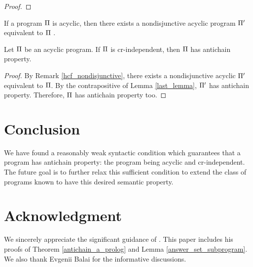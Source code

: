 \documentclass{paper}
\begin{document}
\begin{flushleft}
\begin{proof}
\end{proof}

\begin{remark}
\label{hcf_nondisjunctive}

If a \cp{} program $\Pi$ is acyclic,
then there exists a nondisjunctive acyclic \cp{} program
${\Pi}'$ equivalent to $\Pi$
\cite[page 73, Theorem 4.17]{hcfb}.

\end{remark}

\begin{theorem}
\label{last_theorem}

Let $\Pi$ be an acyclic \cp{} program.
If $\Pi$ is cr-independent,
then $\Pi$ has antichain property.

\end{theorem}

\begin{proof}

By Remark \ref{hcf_nondisjunctive},
there exists a nondisjunctive acyclic \cp{} ${\Pi}'$
equivalent to $\Pi$.
By the contrapositive of Lemma \ref{last_lemma},
${\Pi}'$ has antichain property.
Therefore, $\Pi$ has antichain property too.

\end{proof}


\section{Conclusion}

We have found a reasonably weak syntactic condition
which guarantees that
a \cp{} program has antichain property:
the program being acyclic and cr-independent.
The future goal is to further relax
this sufficient condition to extend the class of
\cp{} programs known to have
this desired semantic property.


\section{Acknowledgment}

We sincerely appreciate the significant guidance of \mg.
This paper includes his proofs of
Theorem \ref{antichain_a_prolog} and
Lemma \ref{answer_set_subprogram}.
We also thank Evgenii Balai for the
informative discussions.


\end{flushleft}

\newpage


\end{document}
